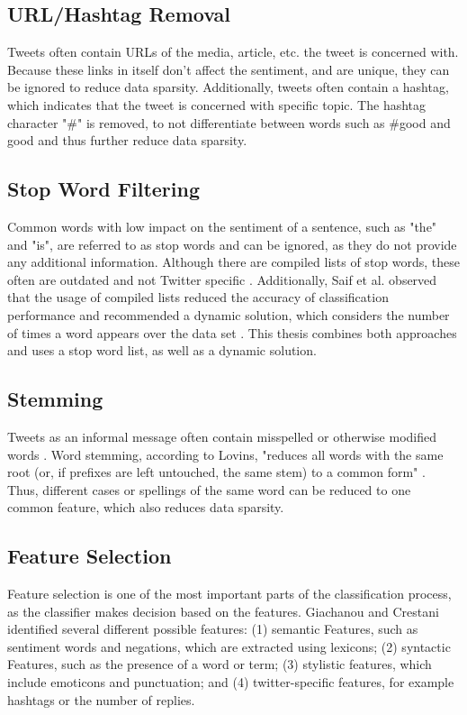 \subsection{URL/Hashtag Removal}
Tweets often contain URLs of the media, article, etc. the tweet is concerned with. Because these links in itself don't affect the sentiment, and are unique, they can be ignored to reduce data sparsity. Additionally, tweets often contain a hashtag, which indicates that the tweet is concerned with specific topic. The hashtag character "\#" is removed, to not differentiate between words such as \#good and good and thus further reduce data sparsity.

\subsection{Stop Word Filtering}
Common words with low impact on the sentiment of a sentence, such as "the" and "is", are referred to as stop words and can be ignored, as they do not provide any additional information. Although there are compiled lists of stop words, these often are outdated and not Twitter specific \cite{DBLP:journals/csur/GiachanouC16}. Additionally, Saif et al. observed that the usage of compiled lists reduced the accuracy of classification performance and recommended a dynamic solution, which considers the number of times a word appears over the data set \cite{data_sparsity}. This thesis combines both approaches and uses a stop word list, as well as a dynamic solution.

\subsection{Stemming}
Tweets as an informal message often contain misspelled or otherwise modified words \cite{DBLP:journals/csur/GiachanouC16}. Word stemming, according to Lovins, "reduces all words with the same root (or, if prefixes are left
untouched, the same stem) to a common form" \cite[p.~22]{Lovins1968DevelopmentOA}. Thus, different cases or spellings of the same word can be reduced to one common feature, which also reduces data sparsity.

\subsection{Feature Selection}
Feature selection is one of the most important parts of the classification process, as the classifier makes decision based on the features. Giachanou and Crestani identified several different possible features: (1) semantic Features, such as sentiment words and negations, which are extracted using lexicons; (2) syntactic Features, such as the presence of a word or term; (3) stylistic features, which include emoticons and punctuation; and (4) twitter-specific features, for example hashtags or the number of replies.

